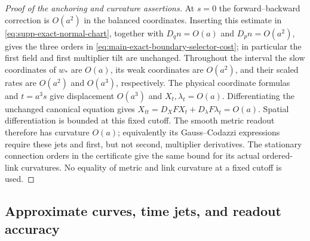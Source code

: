 \documentclass[11pt]{article}
\numberwithin{equation}{section}
\theoremstyle{definition}
\theoremstyle{remark}
\begin{document}
\begin{proof}[Proof of the anchoring and curvature assertions]
At $s=0$ the forward--backward correction is $O(a^2)$ in the balanced
coordinates.  Inserting this estimate in
\eqref{eq:supp-exact-normal-chart}, together with
$D_qn=O(a)$ and $D_pn=O(a^2)$, gives the three orders in
\eqref{eq:main-exact-boundary-selector-cost}; in particular the first field and
first multiplier tilt are unchanged.  Throughout the interval the slow
coordinates of $w_*$ are $O(a)$, its weak coordinates are $O(a^2)$, and
their scaled rates are $O(a^2)$ and $O(a^3)$, respectively. The physical
coordinate formulas and $t=a^3s$ give displacement $O(a^3)$ and
$X_t,\lambda_t=O(a)$. Differentiating the unchanged canonical equation
gives $X_{tt}=D_XF X_t+D_\lambda F\lambda_t=O(a)$.
Spatial differentiation is bounded at this fixed cutoff. The smooth
metric readout therefore has curvature $O(a)$; equivalently its
Gauss--Codazzi expressions require these jets and first, but not second,
multiplier derivatives. The stationary connection orders in the certificate
give the same bound for its actual ordered-link curvatures. No equality of
metric and link curvature at a fixed cutoff is used.
\end{proof}


\subsection{Approximate curves, time jets, and readout accuracy}
\label{subsec:supp-exact-accuracy}
\end{document}
